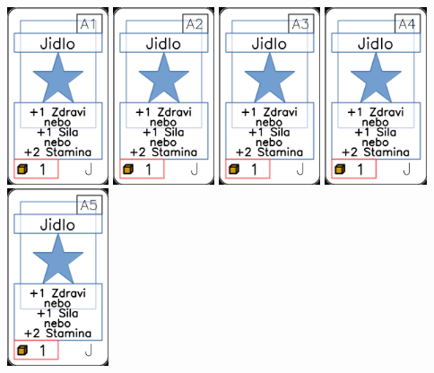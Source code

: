 \documentclass[a4paper]{article}
\begin{document}
	\includegraphics[width=3.0cm]{img-1_0}
	\includegraphics[width=3.0cm]{img-1_1}
	\includegraphics[width=3.0cm]{img-1_2}
	\includegraphics[width=3.0cm]{img-1_3}
	\includegraphics[width=3.0cm]{img-1_4}
\end{document}
